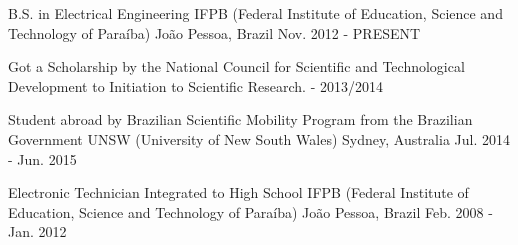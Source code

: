 

\begin{cventries}

  \cventry
    {B.S. in Electrical Engineering} %
    {IFPB (Federal Institute of Education, Science and Technology of Paraíba)} %
    {João Pessoa, Brazil} %
    {Nov. 2012 - PRESENT} %
    {
      \begin{cvitems} %
        \item {Got a Scholarship by the National Council for Scientific and Technological Development to Initiation to Scientific Research. - 2013/2014}
      \end{cvitems}
    }
    
    \cventry
    {Student abroad by Brazilian Scientific Mobility Program from the Brazilian Government} %
    {UNSW (University of New South Wales)} %
    {Sydney, Australia} %
    {Jul. 2014 - Jun. 2015} %
    {
    }
    
    \cventry
    {Electronic Technician Integrated to High School} %
    {IFPB (Federal Institute of Education, Science and Technology of Paraíba)} %
    {João Pessoa, Brazil} %
    {Feb. 2008 - Jan. 2012} %
    {
    }

\end{cventries}
